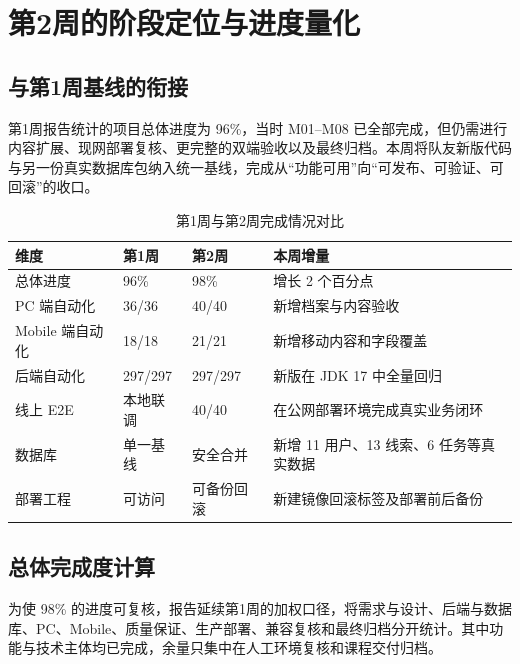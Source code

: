 \documentclass[UTF8,a4paper,zihao=-4,fontset=mac]{ctexart}
\begin{document}
\section{第2周的阶段定位与进度量化}

\subsection{与第1周基线的衔接}

第1周报告统计的项目总体进度为 96\%，当时 M01--M08 已全部完成，但仍需进行内容扩展、现网部署复核、更完整的双端验收以及最终归档。本周将队友新版代码与另一份真实数据库包纳入统一基线，完成从“功能可用”向“可发布、可验证、可回滚”的收口。

\begin{table}[H]
\centering
\caption{第1周与第2周完成情况对比}
\label{tab:week-compare}
\begin{tabularx}{\textwidth}{L{3.4cm}C{3.0cm}C{3.0cm}Y}
\toprule
{}\color{white}\bfseries 维度 & \color{white}\bfseries 第1周 & \color{white}\bfseries 第2周 & \color{white}\bfseries 本周增量 \\
\midrule
总体进度 & 96\% & 98\% & 增长 2 个百分点 \\
PC 端自动化 & 36/36 & 40/40 & 新增档案与内容验收 \\
Mobile 端自动化 & 18/18 & 21/21 & 新增移动内容和字段覆盖 \\
后端自动化 & 297/297 & 297/297 & 新版在 JDK 17 中全量回归 \\
线上 E2E & 本地联调 & 40/40 & 在公网部署环境完成真实业务闭环 \\
数据库 & 单一基线 & 安全合并 & 新增 11 用户、13 线索、6 任务等真实数据 \\
部署工程 & 可访问 & 可备份回滚 & 新建镜像回滚标签及部署前后备份 \\
\bottomrule
\end{tabularx}
\end{table}

\subsection{总体完成度计算}

为使 98\% 的进度可复核，报告延续第1周的加权口径，将需求与设计、后端与数据库、PC、Mobile、质量保证、生产部署、兼容复核和最终归档分开统计。其中功能与技术主体均已完成，余量只集中在人工环境复核和课程交付归档。
\end{document}
